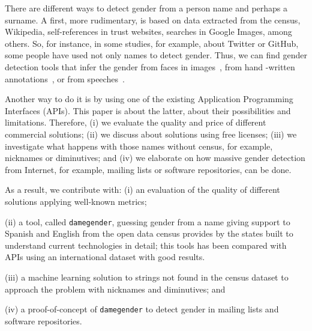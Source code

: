 \documentclass[a4paper]{article}
\begin{document}
There are different ways to detect gender from a person name and perhaps a surname.
A first, more rudimentary, is based on data extracted from the census, Wikipedia, self-references in trust websites, searches in Google Images, among others.
So, for instance, in some studies, for example, about Twitter or GitHub, some people have used not only names to detect gender. 
Thus, we can find gender detection tools that infer the gender from faces in images~\cite{ranjan2017hyperface}, from hand -written annotations~\cite{liwicki2011automatic}, or from speeches~\cite{koppel2002automatically}.

Another way to do it is by using one of the existing Application Programming Interfaces (APIs).
This paper is about the latter, about their possibilities and limitations.
Therefore, (i) we evaluate the quality and price of different commercial solutions;
(ii) we discuss about solutions using free licenses;
(iii) we investigate what happens with those names without census, for example, nicknames or diminutives; and
(iv) we elaborate on how massive gender detection from Internet, for example, mailing
  lists or software repositories, can be done.

As a result, we contribute with: 
(i) an evaluation of the quality of different solutions applying well-known metrics;

(ii) a tool, called \texttt{damegender}, guessing gender from a name
  giving support to Spanish and English from the open data census
  provides by the states built to understand current technologies in
  detail; this tools has been compared with APIs using an international
  dataset with good results.
  
(iii) a machine learning solution to strings not found in the census
  dataset to approach the problem with nicknames and diminutives; and
  
(iv) a proof-of-concept of \texttt{damegender} to detect
  gender in mailing lists and software repositories.

%
\end{document}
